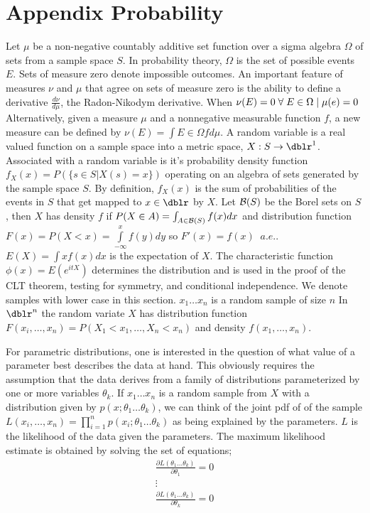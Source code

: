 \chapter{Appendix Probability}

Let $\mu$ be a non-negative countably additive set function over a sigma algebra $\Omega$ of sets from a sample space $S$. In probability theory, $\Omega$ is the set of possible events $E$. Sets of measure zero denote impossible outcomes. An important feature of measures $\nu$ and $\mu$ that agree on sets of measure zero is the ability to define a derivative $\frac{d \nu}{d \mu}$, the Radon-Nikodym derivative.  When $\nu (E)=0 \; \forall \; E \in \Omega \;| \; \mu(e)=0$  Alternatively, given a measure $\mu$ and a nonnegative measurable function $f$, a new measure can be defined by $ \nu(E) = \int\limits{E \in \Omega}{} f d \mu$. A random variable is a real valued function on a sample space into a metric space, $X : S \rightarrow \dblr^{1} $. Associated with a random variable is it's probability density function $f_{X}(x)=P(\{s \in S | X(s) = x\})$ operating on an algebra of sets generated by the sample space $S$. By definition, $f_{X}(x)$ is the sum of probabilities of the events in $S$ that get mapped to $x \in \dblr$ by $X$.  Let $\mathcal{B}(S)$ be the Borel sets on $S$, then $X$ has density $f$ if $P(X \in A) = \int_{A \in \mathcal{B}(S)} f(x) dx $ and distribution function $F(x) = P(X<x)=\int\limits_{-\infty}^x f(y) dy$ so $F'(x)=f(x) \;\; a.e.$.  $E(X)=\int x f(x) dx$ is the expectation of $X$.  The characteristic function $\phi(x) = E(e^{itX} )$ determines the distribution and is used in the proof of the CLT theorem, testing for symmetry, and conditional independence.  We denote samples with lower case in this section.  $x_1 \ldots x_n$ is a random sample of size $n$  In $\dblr^n$ the random variate $X$ has distribution function $F(x_i, \ldots , x_n) = P(X_1<x_1, \ldots , X_n<x_n )$ and density $f(x_1, \ldots , x_n )$.

For parametric distributions, one is interested in the question of what value of a parameter best describes the data at hand.  This obviously requires the assumption that the data derives from a family of distributions parameterized by one or more variables $\theta_k$.  If $x_1 \ldots x_n$ is a random sample from $X$ with a distribution given by $p(x;\theta_1 \ldots \theta_k)$, we can think of the joint pdf of of the sample $L(x_i, \ldots,x_n) = \prod\limits_{i=1}^{n} p(x_i;\theta_1 \ldots \theta_k)$ as being explained by the parameters.  $L$ is the likelihood of the data given the parameters.  The maximum likelihood estimate is obtained by solving the set of equations;
\begin{eqnarray} \nonumber
  \frac{\partial L(\theta_1 \ldots \theta_k)}{\partial
  \theta_1}=0 \\ \nonumber
  \vdots \\ \nonumber
   \frac{\partial L(\theta_1 \ldots \theta_k)}{\partial
   \theta_k}=0 \\ \nonumber
\end{eqnarray}

